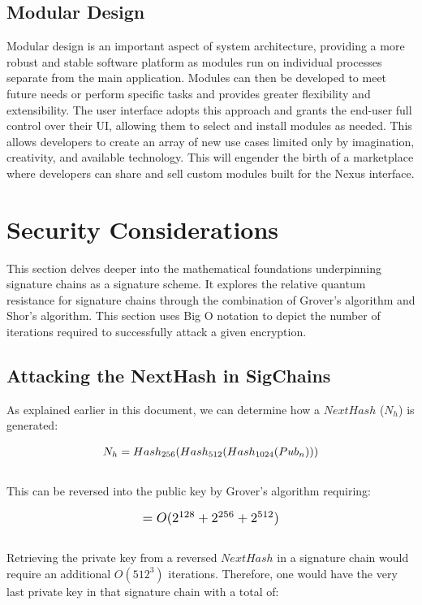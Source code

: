 \documentclass[11pt]{article}
\begin{document}
\subsection{Modular Design}

Modular design is an important aspect of system architecture, providing a more robust and stable software platform as modules run on individual processes separate from the main application. 
Modules can then be developed to meet future needs or perform specific tasks and provides greater flexibility and extensibility.
The user interface adopts this approach and grants the end-user full control over their UI, allowing them to select and install modules as needed.
This allows developers to create an array of new use cases limited only by imagination, creativity, and available technology.
This will engender the birth of a marketplace where developers can share and sell custom modules built for the Nexus interface.


\section{Security Considerations}

\noindent This section delves deeper into the mathematical foundations underpinning signature chains as a signature scheme. 
It explores the relative quantum resistance for signature chains through the combination of Grover's algorithm and Shor's algorithm. 
This section uses Big O notation \cite{Big_O_Notation} to depict the number of iterations required to successfully attack a given encryption.\\

\subsection{Attacking the NextHash in SigChains}

\noindent As explained earlier in this document, we can determine how a $NextHash$ ($N_{h}$) is generated: 

\begin{equation}
\label{eq:Next Hash in Chain}
\resizebox{.55\hsize}{!}
{$
N_{h} = Hash_{256}( Hash_{512} ( Hash_{1024}(Pub_{n}))) 
$}
\end{equation}
\\
\noindent This can be reversed into the public key by Grover's algorithm requiring:

\begin{equation}
\label{eq:Iterations required to reverse the public key from a NextHash}
\resizebox{.35\hsize}{!}
{$
= O(2^{128} + 2^{256} + 2^{512})
$}
\end{equation}
\\
\noindent Retrieving the private key from a reversed $NextHash$ in a signature chain would require an additional $O(512^3)$ iterations. Therefore, one would have the very last private key in that signature chain with a total of:
\end{document}
